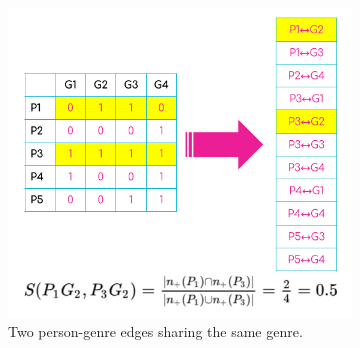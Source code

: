 \documentclass[a4paper,12pt]{extarticle}
\begin{document}
\begin{figure}[t!]
    \captionsetup[subfigure]{font=footnotesize,labelfont=footnotesize}
     \centering
     \begin{subfigure}[b]{0.6\textwidth}
        \includegraphics[width=1.0\textwidth]{Toy/link-clust-toy1.png}
        \caption{Two person-genre edges sharing the same genre.}
        \label{fig:link-toy1}
    \end{subfigure} 
     \begin{subfigure}[b]{0.3\textwidth}

\end{subfigure}
\end{figure}
\end{document}
